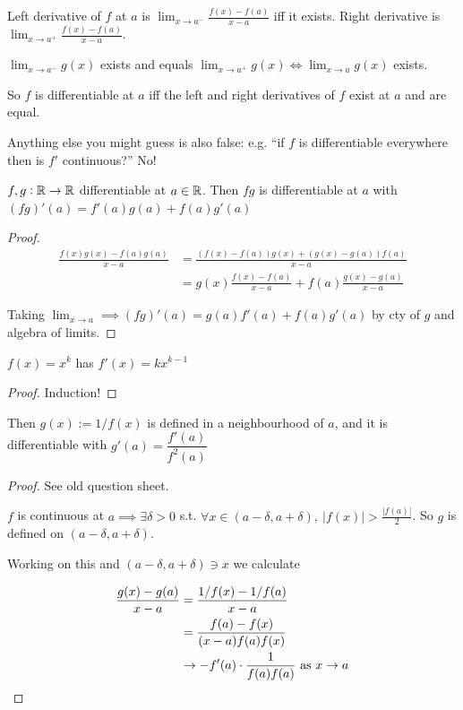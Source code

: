 \documentclass[10pt,twoside]{scrartcl}
\begin{document}
\begin{definition}
Left derivative of $f$ at $a$ is $\lim_{x \to a^-}\frac{f(x) -f(a)}{x-a}$ iff it exists. Right derivative is $\lim_{x \to a^+}\frac{f(x) -f(a)}{x-a}$. 

$\lim_{x \to a^-}g(x)$ exists and equals $\lim_{x \to a^+}g(x) \iff \lim_{x\to a}g(x)$ exists.
\end{definition}

So $f$ is differentiable at $a$ iff the left and right derivatives of $f$ exist at $a$ and are equal. 

Anything else you might guess is also false: e.g. ``if $f$ is differentiable everywhere then is $f'$ continuous?'' No!\vspace*{10pt}

\begin{theorem} $f,g : \mathbb{R} \to \mathbb{R}$ differentiable at $a \in \mathbb{R}$. Then $fg$ is differentiable at $a$ with $(fg)'(a) = f'(a)g(a) + f(a)g'(a)$
\end{theorem}
\begin{proof}
\begin{align*}
	\frac{f(x)g(x) - f(a)g(a)}{x-a} &= \frac{(f(x)-f(a))g(x) + (g(x) - g(a))f(a)}{x-a} \\ 
	&= g(x) \frac{f(x)-f(a)}{x-a} + f(a)\frac{g(x)-g(a)}{x-a}
\end{align*}

Taking $\lim_{x\to a} \implies (fg)'(a) = g(a)f'(a) + f(a)g'(a)$ by cty of $g$ and algebra of limits.
\end{proof}\vsp


\begin{corollary}
$f(x) = x^k$ has $f'(x) = kx^{k-1}$	
\end{corollary}
\begin{proof}
Induction!	
\end{proof}

Then $g(x) := 1/f(x)$ is defined in a neighbourhood of $a$, and it is differentiable with $g'(a) = \dfrac{f'(a)}{f^2(a)}$

\begin{proof}
See old question sheet.

 $f$ is continuous at $a \implies \exists \delta > 0$ s.t. $\forall x \in (a-\delta,a+\delta),~|f(x)| > \frac{|f(a)|}{2}$. So $g$ is defined on $(a-\delta,a+\delta)$. 
 
 Working on this and $(a-\delta,a+\delta)\ni x$ we calculate
 
 \begin{align*}\frac{g(x) -g(a)}{x-a} &= \dfrac{1/f(x) -1/f(a)}{x-a}\\
 &= \frac{f(a) - f(x)}{(x-a)f(a)f(x)}\\
 &\to -f'(a)\cdot\frac{1}{f(a)f(a)} \text{ as } x \to a \qedhere
\end{align*}
\end{proof}
\end{document}
